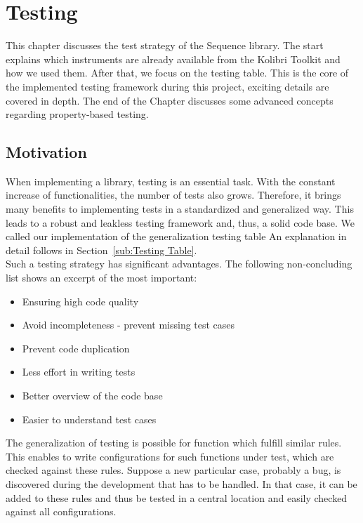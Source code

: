 \section{Testing}
\label{sec:Testing}
This chapter discusses the test strategy of the Sequence library. The start
explains which instruments are already available from the Kolibri Toolkit and
how we used them. After that, we focus on the testing table. 
This is the core of the implemented testing framework during this project,
exciting details are covered in depth. The end of the Chapter discusses some
advanced concepts regarding property-based testing.

\subsection{Motivation}
\label{sub:Motivation}
When implementing a library, testing is an essential task. With the constant
increase of functionalities, the number of tests also grows. Therefore, it
brings many benefits to implementing tests in a standardized and generalized
way. This leads to a robust and leakless testing framework and, thus, a solid
code base. We called our implementation of the generalization testing table
An explanation in detail follows in Section~\ref{sub:Testing Table}. \\
Such a testing strategy has significant advantages. The following
non-concluding list shows an excerpt of the most important:

\begin{itemize}
  \item{Ensuring high code quality}
  \item{Avoid incompleteness - prevent missing test cases}
  \item{Prevent code duplication}
  \item{Less effort in writing tests}
  \item{Better overview of the code base}
  \item{Easier to understand test cases}
\end{itemize}

The generalization of testing is possible for function which fulfill similar
rules. This enables to write configurations for such functions
under test, which are checked against these rules. Suppose a new particular case, probably a bug, is
discovered during the development that has to be handled. In that case, it can
be added to these rules and thus be tested in a central location and easily
checked against all configurations.

